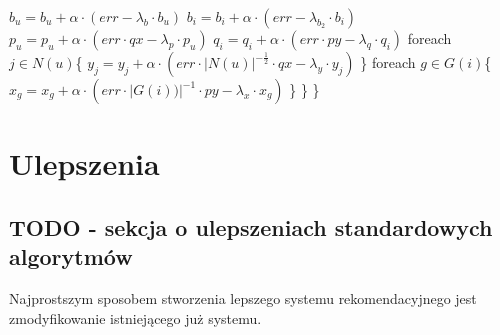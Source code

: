 \documentclass{pracamgr}
\begin{document}
    \hspace*{48pt}			$b_u=b_u+\alpha\cdot(err-\lambda_b\cdot b_u)$\newline
    \hspace*{48pt}			$b_i=b_i+\alpha\cdot(err-\lambda_{b_2}\cdot b_i)$\newline
    \hspace*{48pt}			$p_u=p_u+\alpha\cdot(err\cdot qx-\lambda_p\cdot p_u)$\newline
    \hspace*{48pt}			$q_i=q_i+\alpha\cdot(err\cdot py-\lambda_q\cdot q_i)$\newline
    \hspace*{48pt}			foreach $j\in N(u)$\{\newline
    \hspace*{64pt}				$y_j=y_j+\alpha\cdot(err\cdot |N(u)|^{-\frac{1}{2}}\cdot qx-\lambda_y\cdot y_j)$\newline
    \hspace*{48pt}			\}\newline
    \hspace*{48pt}			foreach $g\in G(i)$\{\newline
    \hspace*{64pt}				$x_g=x_g+\alpha\cdot(err\cdot |G(i))|^{-1}\cdot py-\lambda_x\cdot x_g)$\newline
    \hspace*{48pt}			\}\newline
    \hspace*{32pt}		\}\newline
    \hspace*{16pt}	\}\newline
 \chapter{Ulepszenia}
  \section{TODO - sekcja o ulepszeniach standardowych algorytmów}
   Najprostszym sposobem stworzenia lepszego systemu rekomendacyjnego jest zmodyfikowanie istniejącego już systemu.\newline
   
\end{document}
